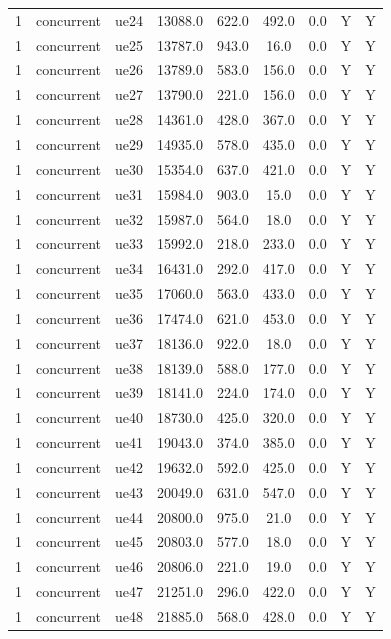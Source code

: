 \begin{table}[ht]
\begin{tabular}{|c|c|c|c|c|c|c|c|c|}
1 & concurrent & ue24 & 13088.0 & 622.0 & 492.0 & 0.0 & Y & Y \\
1 & concurrent & ue25 & 13787.0 & 943.0 & 16.0 & 0.0 & Y & Y \\
1 & concurrent & ue26 & 13789.0 & 583.0 & 156.0 & 0.0 & Y & Y \\
1 & concurrent & ue27 & 13790.0 & 221.0 & 156.0 & 0.0 & Y & Y \\
1 & concurrent & ue28 & 14361.0 & 428.0 & 367.0 & 0.0 & Y & Y \\
1 & concurrent & ue29 & 14935.0 & 578.0 & 435.0 & 0.0 & Y & Y \\
1 & concurrent & ue30 & 15354.0 & 637.0 & 421.0 & 0.0 & Y & Y \\
1 & concurrent & ue31 & 15984.0 & 903.0 & 15.0 & 0.0 & Y & Y \\
1 & concurrent & ue32 & 15987.0 & 564.0 & 18.0 & 0.0 & Y & Y \\
1 & concurrent & ue33 & 15992.0 & 218.0 & 233.0 & 0.0 & Y & Y \\
1 & concurrent & ue34 & 16431.0 & 292.0 & 417.0 & 0.0 & Y & Y \\
1 & concurrent & ue35 & 17060.0 & 563.0 & 433.0 & 0.0 & Y & Y \\
1 & concurrent & ue36 & 17474.0 & 621.0 & 453.0 & 0.0 & Y & Y \\
1 & concurrent & ue37 & 18136.0 & 922.0 & 18.0 & 0.0 & Y & Y \\
1 & concurrent & ue38 & 18139.0 & 588.0 & 177.0 & 0.0 & Y & Y \\
1 & concurrent & ue39 & 18141.0 & 224.0 & 174.0 & 0.0 & Y & Y \\
1 & concurrent & ue40 & 18730.0 & 425.0 & 320.0 & 0.0 & Y & Y \\
1 & concurrent & ue41 & 19043.0 & 374.0 & 385.0 & 0.0 & Y & Y \\
1 & concurrent & ue42 & 19632.0 & 592.0 & 425.0 & 0.0 & Y & Y \\
1 & concurrent & ue43 & 20049.0 & 631.0 & 547.0 & 0.0 & Y & Y \\
1 & concurrent & ue44 & 20800.0 & 975.0 & 21.0 & 0.0 & Y & Y \\
1 & concurrent & ue45 & 20803.0 & 577.0 & 18.0 & 0.0 & Y & Y \\
1 & concurrent & ue46 & 20806.0 & 221.0 & 19.0 & 0.0 & Y & Y \\
1 & concurrent & ue47 & 21251.0 & 296.0 & 422.0 & 0.0 & Y & Y \\
1 & concurrent & ue48 & 21885.0 & 568.0 & 428.0 & 0.0 & Y & Y \\

\end{tabular}
\end{table}
